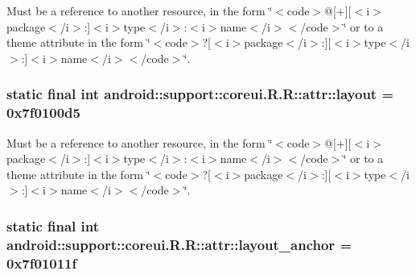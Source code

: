 Must be a reference to another resource, in the form \char`\"{}$<$code$>$@\mbox{[}+\mbox{]}\mbox{[}$<$i$>$package$<$/i$>$:\mbox{]}$<$i$>$type$<$/i$>$:$<$i$>$name$<$/i$>$$<$/code$>$\char`\"{} or to a theme attribute in the form \char`\"{}$<$code$>$?\mbox{[}$<$i$>$package$<$/i$>$:\mbox{]}\mbox{[}$<$i$>$type$<$/i$>$:\mbox{]}$<$i$>$name$<$/i$>$$<$/code$>$\char`\"{}. \hypertarget{classandroid_1_1support_1_1coreui_1_1_r_1_1attr_408601aab91cf9db2058253fae3b6d7e}{
\subsubsection[{layout}]{\setlength{\rightskip}{0pt plus 5cm}static final int android::support::coreui.R.R::attr::layout = 0x7f0100d5}}
\label{classandroid_1_1support_1_1coreui_1_1_r_1_1attr_408601aab91cf9db2058253fae3b6d7e}


Must be a reference to another resource, in the form \char`\"{}$<$code$>$@\mbox{[}+\mbox{]}\mbox{[}$<$i$>$package$<$/i$>$:\mbox{]}$<$i$>$type$<$/i$>$:$<$i$>$name$<$/i$>$$<$/code$>$\char`\"{} or to a theme attribute in the form \char`\"{}$<$code$>$?\mbox{[}$<$i$>$package$<$/i$>$:\mbox{]}\mbox{[}$<$i$>$type$<$/i$>$:\mbox{]}$<$i$>$name$<$/i$>$$<$/code$>$\char`\"{}. \hypertarget{classandroid_1_1support_1_1coreui_1_1_r_1_1attr_f509ca07bc812c8b957fcbf06e90d426}{
\subsubsection[{layout\_\-anchor}]{\setlength{\rightskip}{0pt plus 5cm}static final int android::support::coreui.R.R::attr::layout\_\-anchor = 0x7f01011f}}
\label{classandroid_1_1support_1_1coreui_1_1_r_1_1attr_f509ca07bc812c8b957fcbf06e90d426}



